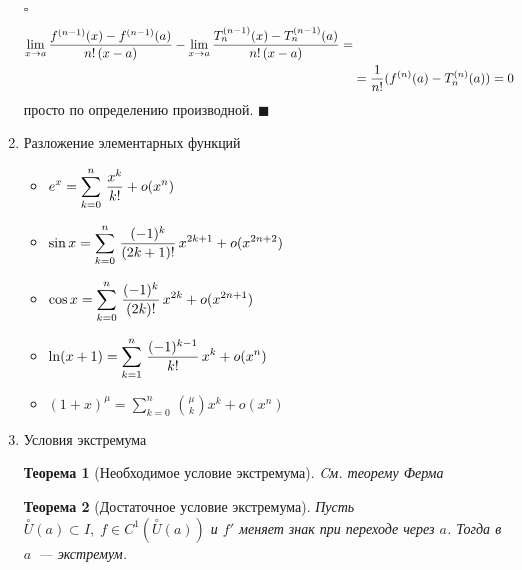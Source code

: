 \documentclass[a4paper,12pt]{article}
\theoremstyle{plain}
\newtheorem{thrm}{Теорема}
\theoremstyle{definition}
\theoremstyle{remark}
\newenvironment{ittproof}{$\square$ }{ $\blacksquare$ \\}
\def\resetdefs{ \setcounter{defn}{0}\setcounter{exmp}{0} }
\def\resetthrm{ \setcounter{thrm}{0}\setcounter{stat}{0} }
\def\resetrem{ \setcounter{rem}{0} }
\def\resetall{ \resetdefs \resetthrm \resetrem}
\def\itemrange#1{%
  \addtocounter{enumi}{1}%
  \edef\labelenumi{\theenumi--\noexpand\theenumi.}%
  \addtocounter{enumi}{-1}%
  \addtocounter{enumi}{#1}%
  \item
  \def\labelenumi{\theenumi.}
}
\begin{document}
\begin{enumerate}
\begin{ittproof}
\begin{align*}
        \lim_{x\to a}{f^{(n-1)}(x) - f^{(n-1)}(a) \over n!\,(x-a)} - 
        \lim_{x\to a}{T_n^{(n-1)}(x) - T_n^{(n-1)}(a) \over n!\,(x-a)} = \\
        &= {1\over n!}(f^{(n)}(a) - T_n^{(n)}(a)) = 0 
      \end{align*} просто по определению производной.
    \end{ittproof}
  \item Разложение элементарных функций
    \begin{itemize}
      \item $\displaystyle e^x = \sum_{k=0}^n\,{x^k\over k!} + o(x^n) $
      \item $\displaystyle \sin x = \sum_{k=0}^n\,{(-1)^k\over (2k+1)!}\,x^{2k+1} + o(x^{2n+2}) $
      \item $\displaystyle \cos x = \sum_{k=0}^n\,{(-1)^k\over (2k)!}\,x^{2k} + o(x^{2n+1}) $
      \item $\displaystyle \ln (x+1) = \sum_{k=1}^n\,{(-1)^{k-1}\over k!}\,x^k + o(x^n) $
      \item $\displaystyle (1+x)^\mu = \sum_{k=0}^n\,\binom \mu k x^k + o(x^n) $
    \end{itemize}
  \itemrange{1} Условия экстремума
    \resetall
    \begin{thrm}[Необходимое условие экстремума]
      \label{thrm:necessity}
      Cм. теорему Ферма
    \end{thrm}
    
    \begin{thrm}[Достаточное условие экстремума]
      \label{thrm:adequacy}
      Пусть  $\overset{\circ}{U}(a)\subset I,\;f\in C^1(\overset{\circ}{U}(a))$ 
      и $f'$ меняет знак при переходе через $a$. Тогда в $a$~--- экстремум. 
    \end{thrm}
    

\end{enumerate}
\end{document}

